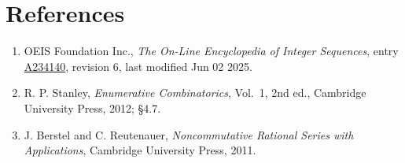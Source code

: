 \documentclass[11pt]{article}
\theoremstyle{definition}
\begin{document}
\section{References}

\begin{enumerate}

\item OEIS Foundation Inc., \emph{The On-Line Encyclopedia of Integer Sequences}, entry \href{https://oeis.org/A234140}{A234140}, revision 6, last modified Jun 02 2025.

\item R. P. Stanley, \emph{Enumerative Combinatorics}, Vol.~1, 2nd ed., Cambridge University Press, 2012; \S4.7.

\item J. Berstel and C. Reutenauer, \emph{Noncommutative Rational Series with Applications}, Cambridge University Press, 2011.

\end{enumerate}
\end{document}
